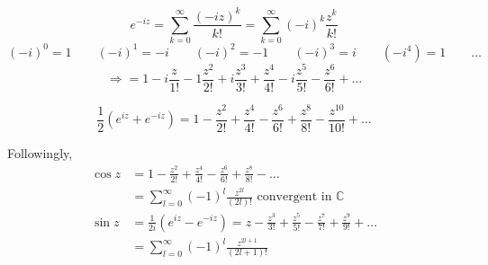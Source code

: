 \documentclass[a4paper,landscape,twocolumn]{article}
\theoremstyle{definition}
\begin{document}
\[ e^{-iz} = \sum_{k=0}^\infty \frac{(-iz)^k}{k!} = \sum_{k=0}^\infty (-i)^k \frac{z^k}{k!} \]
\[ (-i)^0 = 1 \qquad (-i)^1 = -i \qquad (-i)^2 = -1 \qquad (-i)^3 = i \qquad (-i^4) = 1 \qquad \ldots \]
\[ \Rightarrow = 1 - i \frac{z}{1!} - 1\frac{z^2}{2!} + i \frac{z^3}{3!} + \frac{z^4}{4!} - i \frac{z^5}{5!} - \frac{z^6}{6!} + \ldots \]

\[ \frac12 (e^{iz} + e^{-iz}) = 1 - \frac{z^2}{2!} + \frac{z^4}{4!} - \frac{z^6}{6!} + \frac{z^8}{8!} - \frac{z^{10}}{10!} + \ldots \]

Followingly,
\begin{align*}
  \cos{z} &= 1 - \frac{z^2}{2!} + \frac{z^4}{4!} - \frac{z^6}{6!} + \frac{z^8}{8!} - \ldots \\
          &= \sum_{l=0}^\infty (-1)^l \frac{z^{2l}}{(2l)!} \text{ convergent in } \mathbb C \\
  \sin{z} &= \frac1{2i}(e^{iz} - e^{-iz}) = z - \frac{z^3}{3!} + \frac{z^5}{5!} - \frac{z^7}{7!} + \frac{z^9}{9!} + \ldots \\
          &= \sum_{l=0}^\infty (-1)^l \frac{z^{2l + 1}}{(2l+1)!}
\end{align*}
\end{document}
